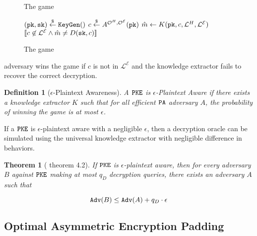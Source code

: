 \documentclass{article}
\newtheorem{definition}{Definition}[section]
\newtheorem{theorem}{Theorem}[section]
\begin{document}
\begin{figure}[H]
    \center
    \begin{minipage}{0.5\textwidth}
        \begin{algorithm}[H]
            \caption{The  game}
            \begin{algorithmic}[1]
                \State $(\texttt{pk}, \texttt{sk}) \stackrel{\$}{\leftarrow} \texttt{KeyGen}()$
                \State $c \stackrel{\$}{\leftarrow} A^{\mathcal{O}^H, \mathcal{O}^\mathcal{E}}(\texttt{pk})$
                \State $\hat{m} \leftarrow K(\texttt{pk}, c, \mathcal{L}^H, \mathcal{L}^\mathcal{E})$
                \State \Return $[\![ c \not\in \mathcal{L}^\mathcal{E} \land \hat{m} \neq D(\texttt{sk}, c)]\!]$
            \end{algorithmic}
        \end{algorithm}
    \end{minipage}
    \caption{The  game}\label{fig:pa-game}
\end{figure}

 adversary wins the game if $c$ is not in $\mathcal{L}^\mathcal{E}$ and the knowledge extractor fails to recover the correct decryption.

\begin{definition}[$\epsilon$-Plaintext Awareness]\label{def:pa}
    A $\texttt{PKE}$ is $\epsilon$-Plaintext Aware if there exists a knowledge extractor $K$ such that for all efficient $\texttt{PA}$ adversary $A$, the probability of winning the game is at most $\epsilon$.
\end{definition}

If a $\texttt{PKE}$ is $\epsilon$-plaintext aware with a negligible $\epsilon$, then a decryption oracle can be simulated using the universal knowledge extractor with negligible difference in behaviors.

\begin{theorem}[\cite{bellare1998relations} theorem 4.2]\label{thm:pa-implies-cca}
    If $\texttt{PKE}$ is $\epsilon$-plaintext aware, then for every  adversary $B$ against $\texttt{PKE}$ making at most $q_D$ decryption queries, there exists an  adversary $A$ such that

    \begin{equation*}
        \texttt{Adv}(B) \leq \texttt{Adv}(A) + q_D \cdot \epsilon
    \end{equation*}
\end{theorem}

\subsection{Optimal Asymmetric Encryption Padding}\label{sec:oaep}



\end{document}
